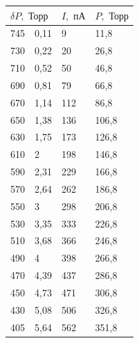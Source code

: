 \documentclass[a4paper,12pt]{article} %
\begin{document}
\begin{table}[h!]
\begin{tabular}{|ll|l|l|}
\hline
\multicolumn{2}{|l|}{$\delta P,  \text{ Торр}$} & $I, \text{ пА}$ & $P, \text{ Торр}$ \\ \hline
\multicolumn{1}{|l|}{745}        & 0,11        & 9               & 11,8              \\ \hline
\multicolumn{1}{|l|}{730}        & 0,22        & 20              & 26,8              \\ \hline
\multicolumn{1}{|l|}{710}        & 0,52        & 50              & 46,8              \\ \hline
\multicolumn{1}{|l|}{690}        & 0,81        & 79              & 66,8              \\ \hline
\multicolumn{1}{|l|}{670}        & 1,14        & 112             & 86,8              \\ \hline
\multicolumn{1}{|l|}{650}        & 1,38        & 136             & 106,8             \\ \hline
\multicolumn{1}{|l|}{630}        & 1,75        & 173             & 126,8             \\ \hline
\multicolumn{1}{|l|}{610}        & 2           & 198             & 146,8             \\ \hline
\multicolumn{1}{|l|}{590}        & 2,31        & 229             & 166,8             \\ \hline
\multicolumn{1}{|l|}{570}        & 2,64        & 262             & 186,8             \\ \hline
\multicolumn{1}{|l|}{550}        & 3           & 298             & 206,8             \\ \hline
\multicolumn{1}{|l|}{530}        & 3,35        & 333             & 226,8             \\ \hline
\multicolumn{1}{|l|}{510}        & 3,68        & 366             & 246,8             \\ \hline
\multicolumn{1}{|l|}{490}        & 4           & 398             & 266,8             \\ \hline
\multicolumn{1}{|l|}{470}        & 4,39        & 437             & 286,8             \\ \hline
\multicolumn{1}{|l|}{450}        & 4,73        & 471             & 306,8             \\ \hline
\multicolumn{1}{|l|}{430}        & 5,08        & 506             & 326,8             \\ \hline
\multicolumn{1}{|l|}{405}        & 5,64        & 562             & 351,8             \\ \hline

\end{tabular}
\end{table}
\end{document}
